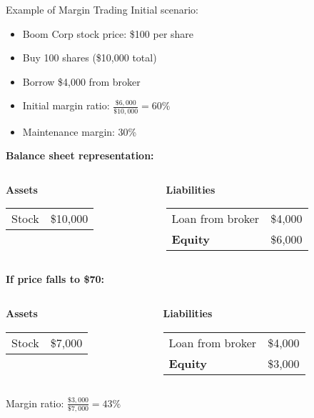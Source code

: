 \documentclass[10pt]{beamer}
\begin{document}
\begin{frame}{Example of Margin Trading}
  Initial scenario:
  \begin{itemize}
    \item Boom Corp stock price: \$100 per share
    \item Buy 100 shares (\$10,000 total)
    \item Borrow \$4,000 from broker
    \item Initial margin ratio: $\tfrac{\$6,000}{\$10,000} = 60\%$
    \item Maintenance margin: 30\%
  \end{itemize}
  
  \pause
  \textbf{Balance sheet representation:}
  \begin{columns}
    \begin{column}{0.45\textwidth}
      \textbf{Assets} \vspace{0.2em}\\
      \begin{tabular}{lr}
        Stock & \$10,000 \\
      \end{tabular}
    \end{column}
    \begin{column}{0.45\textwidth}
      \textbf{Liabilities} \vspace{0.2em}\\
      \begin{tabular}{lr}
        Loan from broker & \$4,000 \\[0.5em]
        \textbf{Equity} & \$6,000 \\
      \end{tabular}
    \end{column}
  \end{columns}
  
  \pause
  \textbf{If price falls to \$70:}
  \begin{columns}
    \begin{column}{0.45\textwidth}
      \textbf{Assets} \vspace{0.2em}\\
      \begin{tabular}{lr}
        Stock & \$7,000 \\
      \end{tabular}
    \end{column}
    \begin{column}{0.45\textwidth}
      \textbf{Liabilities} \vspace{0.2em}\\
      \begin{tabular}{lr}
        Loan from broker & \$4,000 \\[0.5em]
        \textbf{Equity} & \$3,000 \\
      \end{tabular}
    \end{column}
  \end{columns}

  \pause
  Margin ratio: $\tfrac{\$3,000}{\$7,000} = 43\%$
\end{frame}
\end{document}
